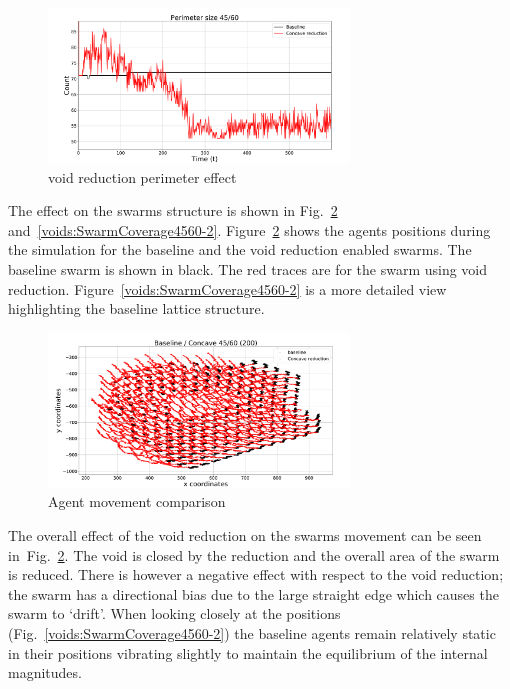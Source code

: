\documentclass[preprint,12pt]{elsarticle}
\begin{document}
\begin{figure}
\begin{center}
\includegraphics[width=8cm]{figures/ConcavePerimeter4560-1}
\end{center}
\caption{void reduction perimeter effect\label{methods:ConcavePerimeter4560-1}}
\end{figure}
The effect on the swarms structure is shown in Fig.~\ref{voids:SwarmCoverage4560-1} and~\ref{voids:SwarmCoverage4560-2}. Figure~\ref{voids:SwarmCoverage4560-1} shows the agents positions during the simulation for the baseline and the void reduction enabled swarms. The baseline swarm is shown in black. The red traces are for the swarm using void reduction. Figure~\ref{voids:SwarmCoverage4560-2} is a more detailed view highlighting the baseline lattice structure.
\begin{figure}
\begin{center}
\includegraphics[width=8cm]{figures/SwarmCoverage4560-1}
\end{center}
\caption{Agent movement comparison\label{voids:SwarmCoverage4560-1}}
\end{figure}
The overall effect of the void reduction on the swarms movement can be seen in~Fig.~\ref{voids:SwarmCoverage4560-1}. The void is closed by the reduction and the overall area of the swarm is reduced. There is however a negative effect with respect to the void reduction; the swarm has a directional bias due to the large straight edge which causes the swarm to `drift'. When looking closely at the positions (Fig.~\ref{voids:SwarmCoverage4560-2}) the baseline agents remain relatively static in their positions vibrating slightly to maintain the equilibrium of the internal magnitudes. 
\end{document}
